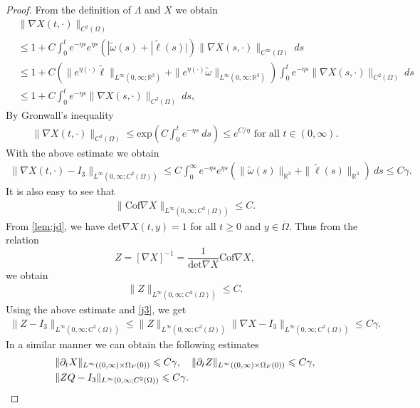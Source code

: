\documentclass[12pt,a4paper,reqno]{amsart}
\theoremstyle{definition}
\theoremstyle{remark}
\numberwithin{equation}{section}
\newcommand{\ofo}{\Omega_{F}(0)}
\newcommand{\rt}{\mathbb{R}^{3}}
\newcommand{\ds}{\displaystyle}
\begin{document}
\begin{proof}
From the definition of $\Lambda$ and $X$ we obtain
\begin{align*}
&\|\nabla X(t,\cdot)\|_{C^{2}(\Omega)} \\
&\leqslant 1 + C \int_{0}^{t} e^{-\eta s} e^{\eta s} \left(|\widetilde \omega(s)+ |\widetilde \ell(s)|\right)  \|\nabla X(s,\cdot)\|_{C^{\infty}(\Omega)} \ ds \\
&\leqslant 1 + C \left( \|e^{\eta (\cdot)}\widetilde \ell \|_{L^{\infty}(0,\infty;\rt)} + \|e^{\eta (\cdot)}\widetilde\omega \|_{L^{\infty}(0,\infty;\rt)}\right) \int_{0}^{t} e^{-\eta s}  \|\nabla X(s,\cdot)\|_{C^{2}(\Omega)}  \ ds \\
& \leqslant 1 + C \int_{0}^{t}e^{-\eta s}  \|\nabla X(s,\cdot)\|_{C^{2}(\Omega)} \ ds,
\end{align*}
 By Gronwall's inequality
\begin{align*}
\|\nabla X(t,\cdot)\|_{C^{2}(\Omega)} \leqslant \mathrm{exp} \left(C  \int_{0}^{t} e^{-\eta s} \ ds  \right)  \leqslant e^{C/\eta} \mbox{ for all } t \in (0,\infty).
\end{align*}
With the above estimate  we obtain
\begin{align} \label{j3}
\|\nabla X(t,\cdot) - I_{3}\|_{L^{\infty}(0,\infty;C^{2}(\Omega))} \leqslant C \int_{0}^{\infty} e^{-\eta s} e^{\eta s} \left(\|\widetilde \omega(s)\|_{\rt}+ \|\widetilde \ell(s)\|_{\rt}\right)  \ ds \leqslant C \gamma.
\end{align}
It is also easy to see that
\begin{align*}
\|\mathrm{Cof} \nabla X \|_{L^{\infty}(0,\infty;C^{2}(\Omega))} \leqslant C.
\end{align*}
From \cref{lem:jd}, we have $\mathrm{det} \nabla X(t,y) = 1$ for all $t \geqslant 0$ and $y \in \overline{\Omega}.$ 
Thus from the relation
\[ \ds Z = [\nabla X]^{-1} =  \frac{1}{\mathrm{det} \nabla X} \mathrm{Cof} \nabla X, \]
we obtain
\begin{align} \label{z12}
\|Z\|_{L^{\infty}(0,\infty;C^{2}(\Omega))} \leqslant C.
\end{align}
Using the above estimate and \eqref{j3}, we get
\begin{align} \label{z2}
\|Z - I_{3}\|_{L^{\infty}(0,\infty;C^{2}(\Omega))} \leqslant \|Z\|_{L^{\infty}(0,\infty;C^{2}(\Omega))}  \|\nabla X - I_{3}\|_{L^{\infty}(0,\infty;C^{2}(\Omega))}  \leqslant C\gamma.
\end{align}
In a similar manner we can obtain the following estimates
\begin{align} \label{z3}
&\|\partial_{t} X\|_{L^{\infty}((0,\infty)\times \ofo)}\leqslant C\gamma, \quad  \|\partial_{t} Z\|_{L^{\infty}((0,\infty)\times \ofo)}\leqslant C \gamma, \notag \\
&  \|ZQ - I_{3}\|_{L^{\infty}(0,\infty;C^{2}(\Omega))} \leqslant C\gamma.
\end{align}


\end{proof}
\end{document}
